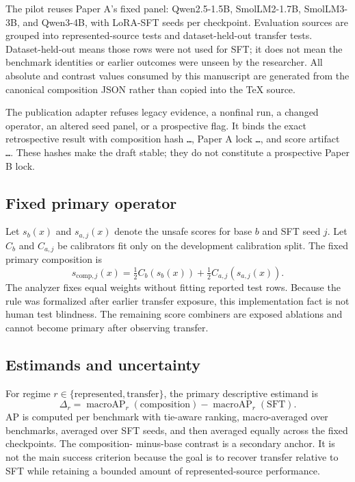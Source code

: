 \documentclass[11pt]{article}
\begin{document}
The pilot reuses Paper A's fixed panel: Qwen2.5-1.5B, SmolLM2-1.7B, SmolLM3-3B, and Qwen3-4B,
with \PilotNSeeds{} LoRA-SFT seeds per checkpoint.  Evaluation sources are grouped into represented-source
tests and dataset-held-out transfer tests.  Dataset-held-out means those rows were not used for
SFT; it does not mean the benchmark identities or earlier outcomes were unseen by the researcher.
All absolute and contrast values consumed by this manuscript are generated from the canonical
composition JSON rather than copied into the TeX source.

The publication adapter refuses legacy evidence, a nonfinal run, a changed operator, an altered
seed panel, or a prospective flag.  It binds the exact retrospective result with composition hash
\texttt{\PilotCompositionHashShort\ldots}, Paper A lock
\texttt{\PilotLockHashShort\ldots}, and score artifact
\texttt{\PilotScoreHashShort\ldots}.  These hashes make the draft stable; they do not constitute a
prospective Paper B lock.

\subsection{Fixed primary operator}

Let $s_b(x)$ and $s_{a,j}(x)$ denote the unsafe scores for base $b$ and SFT seed $j$.  Let
$C_b$ and $C_{a,j}$ be calibrators fit only on the development calibration split.  The fixed
primary composition is
\begin{equation}
  s_{\mathrm{comp},j}(x)
  = \tfrac{1}{2} C_b(s_b(x)) + \tfrac{1}{2} C_{a,j}(s_{a,j}(x)).
  \label{eq:composition}
\end{equation}
The analyzer fixes equal weights without fitting reported test rows.  Because the rule was formalized
after earlier transfer exposure, this implementation fact is not human test blindness.  The remaining
score combiners are exposed ablations and cannot become primary after observing transfer.

\subsection{Estimands and uncertainty}

For regime $r\in\{\mathrm{represented},\mathrm{transfer}\}$, the primary descriptive estimand is
\begin{equation}
  \Delta_r = \operatorname{macroAP}_r(\mathrm{composition})
             - \operatorname{macroAP}_r(\mathrm{SFT}).
\end{equation}
AP is computed per benchmark with tie-aware ranking, macro-averaged over benchmarks, averaged
over SFT seeds, and then averaged equally across the \PilotNModels{} fixed checkpoints.  The composition-
minus-base contrast is a secondary anchor.  It is not the main success criterion because the goal
is to recover transfer relative to SFT while retaining a bounded amount of represented-source
performance.
\end{document}
